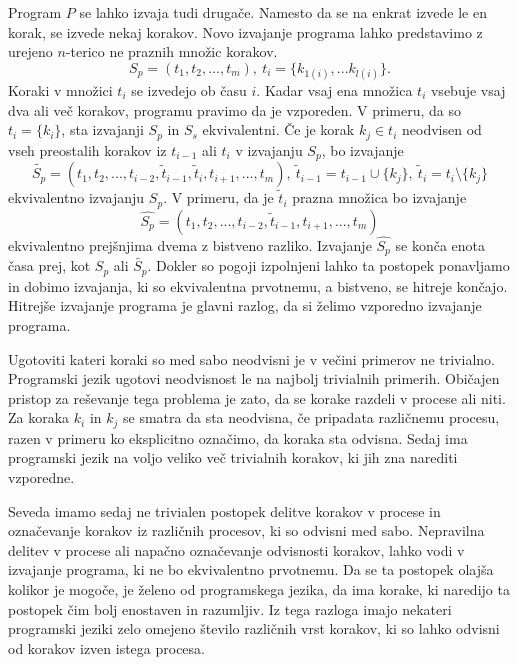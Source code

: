 \documentclass[12pt,a4paper,twoside]{article}
\theoremstyle{definition} %
\theoremstyle{plain} %
\numberwithin{equation}{section}  %
\begin{document}
Program $P$ se lahko izvaja tudi drugače. Namesto da se na enkrat izvede le en korak, se izvede nekaj korakov. Novo izvajanje programa lahko predstavimo z urejeno $n$-terico ne praznih množic korakov. 
$$S_p = (t_1, t_2, ... , t_m),\ t_i = \{ k_{1(i)},...k_{l(i)} \}.$$
Koraki v množici $t_i$ se izvedejo ob času $i$. Kadar vsaj ena množica $t_i$ vsebuje vsaj dva ali več korakov, programu pravimo da je vzporeden. V primeru, da so $t_i = \{k_i\}$, sta izvajanji $S_p$ in $S_s$ ekvivalentni.
Če je korak $k_j \in t_i$ neodvisen od vseh preostalih korakov iz $t_{i-1}$ ali $t_i$ v izvajanju $S_p$, bo izvajanje 
$$\tilde{S_p} = (t_1, t_2, ... , t_{i-2}, \tilde{t}_{i-1}, \tilde{t}_i, t_{i+1}, ..., t_m),\ \tilde{t}_{i-1} =t_{i-1} \cup \{k_j\},\ \tilde{t}_i = t_i \setminus \{k_j\}$$ 
ekvivalentno izvajanju $S_p$. 
V primeru, da je $\tilde{t}_i$ prazna množica bo izvajanje 
$$\hat{S_p} = (t_1, t_2, ... , t_{i-2}, \tilde{t}_{i-1}, t_{i+1}, ..., t_m)$$
ekvivalentno prejšnjima dvema z bistveno razliko. Izvajanje $\hat{S_p}$ se konča enota časa prej, kot $S_p$ ali $\tilde{S_p}$. Dokler so pogoji izpolnjeni lahko ta postopek ponavljamo in dobimo izvajanja, ki so ekvivalentna prvotnemu, a bistveno, se hitreje končajo.
Hitrejše izvajanje programa je glavni razlog, da si želimo vzporedno izvajanje programa.


Ugotoviti kateri koraki so med sabo neodvisni je v večini primerov ne trivialno. Programski jezik ugotovi neodvisnost le na najbolj trivialnih primerih. Običajen pristop za reševanje tega problema je zato, da se korake razdeli v procese ali niti. Za koraka $k_i$ in $k_j$ se smatra da sta neodvisna, če pripadata različnemu procesu, razen v primeru ko eksplicitno označimo, da koraka sta odvisna. Sedaj ima programski jezik na voljo veliko več trivialnih korakov, ki jih zna narediti vzporedne. 

Seveda imamo sedaj ne trivialen postopek delitve korakov v procese in označevanje korakov iz različnih procesov, ki so odvisni med sabo. Nepravilna delitev v procese ali napačno označevanje odvisnosti korakov, lahko vodi v izvajanje programa, ki ne bo ekvivalentno prvotnemu. Da se ta postopek olajša kolikor je mogoče, je želeno od programskega jezika, da ima korake, ki naredijo ta postopek čim bolj enostaven in razumljiv. Iz tega razloga imajo nekateri programski jeziki zelo omejeno število različnih vrst korakov, ki so lahko odvisni od korakov izven istega procesa.
\end{document}
